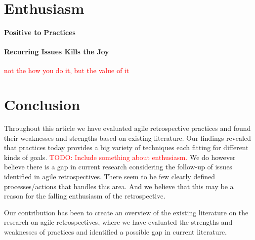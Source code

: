 \documentclass[12pt]{article}
\newcommand\todo[1]{\textcolor{red}{#1}}
\begin{document}
\section{Enthusiasm}

\paragraph{Positive to Practices}

\paragraph{Recurring Issues Kills the Joy}

\todo{not the how you do it, but the value of it}

\section{Conclusion}
Throughout this article we have evaluated agile retrospective practices and found their weaknesses and strengths based on existing literature. Our findings revealed that practices today provides a big variety of techniques each fitting for different kinds of goals. \todo{TODO: Include something about enthusiasm.} We do however believe there is a gap in current research considering the follow-up of issues identified in agile retrospectives. There seem to be few clearly defined processes/actions that handles this area. And we believe that this may be a reason for the falling enthusiasm of the retrospective. 

Our contribution has been to create an overview of the existing literature on the research on agile retrospectives, where we have evaluated the strengths and weaknesses of practices and identified a possible gap in current literature. 

\clearpage



\end{document}

